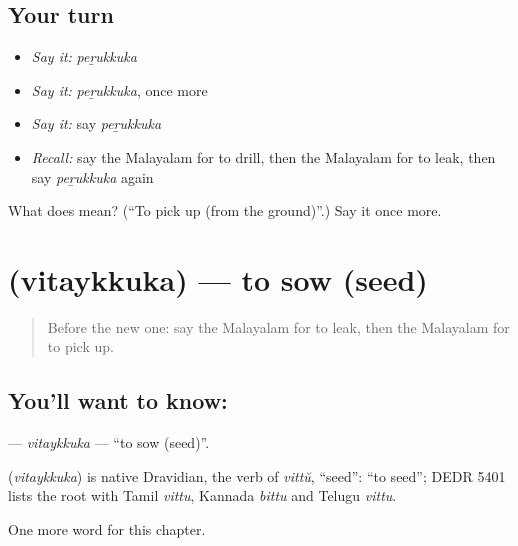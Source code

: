 \subsection*{Your turn}
\begin{itemize}
\raggedright
  \item \emph{Say it:} \emph{peṟukkuka}
  \item \emph{Say it:} \emph{peṟukkuka}, once more
  \item \emph{Say it:} say \emph{peṟukkuka}
  \item \emph{Recall:} say the Malayalam for to drill, then the Malayalam for to leak, then say \emph{peṟukkuka} again
\end{itemize}

\begin{tcolorbox}[breakable,colback=teal!4,colframe=teal!35!black,title={Before you move on}]
What does  mean? (\textquotedblleft{}To pick up (from the ground)\textquotedblright{}.) Say it once more.
\end{tcolorbox}
\section[\texorpdfstring{\ml{വിതയ്ക്കുക} (vitaykkuka)}{വിതയ്ക്കുക (vitaykkuka)}]{ (vitaykkuka) — to sow (seed)}

\label{lesson:ML-C273-vitaykkuka}



\begin{quote}
Before the new one: say the Malayalam for to leak, then the Malayalam for to pick up.
\end{quote}

\subsection*{You'll want to know: }
\textbf{} — \emph{vitaykkuka} — \textquotedblleft{}to sow (seed)\textquotedblright{}.

\begin{cousinweb}
\textbf{} (\emph{vitaykkuka}) is native Dravidian, the verb of \emph{vittŭ}, \textquotedblleft{}seed\textquotedblright{}: \textquotedblleft{}to seed\textquotedblright{}; DEDR 5401 lists the root with Tamil \emph{vittu}, Kannada \emph{bittu} and Telugu \emph{vittu}.
\end{cousinweb}

\begin{grammarlens}[title={What you've built}]
One more word for this chapter.
\end{grammarlens}

